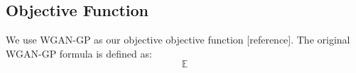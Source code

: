 \subsection{Objective Function}
We use WGAN-GP as our objective objective function [reference]. The original WGAN-GP formula is defined as:
\begin{equation}
\mathbb{E}
\end{equation}